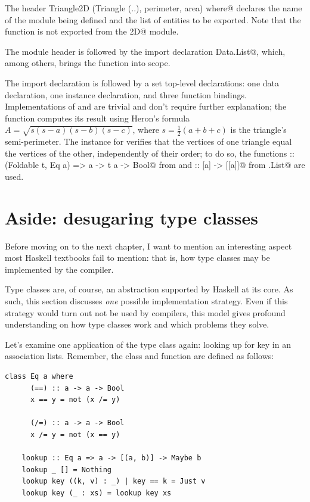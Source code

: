 \documentclass[UdineBachThesis,american,11pt]{PhdThesis}
\begin{document}
  The header
  \lstinline@module Triangle2D (Triangle (..), perimeter, area) where@ declares
  the name of the module being defined and the list of entities to be exported.
  Note that the function \lstinline@segmentLength@ is not exported from the
  \lstinline@Triangle2D@ module.

  The module header is followed by the import declaration
  \lstinline@import Data.List@, which, among others, brings the function
  \lstinline@permutations@ into scope.

  The import declaration is followed by a set top-level declarations: one data
  declaration, one instance declaration, and three function bindings.
  Implementations of \lstinline@perimeter@ and \lstinline@segmentLength@ are
  trivial and don't require further explanation; the \lstinline@area@ function
  computes its result using Heron's formula
  $A = \sqrt{s \left(s - a\right) \left(s - b\right) \left(s - c\right)}$, where
  $s = \frac{1}{2} \left(a + b + c\right)$ is the triangle's semi-perimeter. The
  \lstinline@Eq@ instance for \lstinline@Triangle@ verifies that the vertices of
  one triangle equal the vertices of the other, independently of their order;
  to do so, the functions
  \lstinline@elem :: (Foldable t, Eq a) => a -> t a -> Bool@ from
  \lstinline@Prelude@ and \lstinline@permutations :: [a] -> [[a]]@ from
  \lstinline@Data.List@ are used.

  \section{Aside: desugaring type classes}

  Before moving on to the next chapter, I want to mention an interesting aspect
  most Haskell textbooks fail to mention: that is, how type classes may be
  implemented by the compiler.

  Type classes are, of course, an abstraction supported by Haskell at its core.
  As such, this section discusses \emph{one} possible implementation strategy.
  Even if this strategy would turn out not be used by compilers, this model
  gives profound understanding on how type classes work and which problems they
  solve.

  Let's examine one application of the \lstinline@Eq@ type class again: looking
  up for key in an association lists. Remember, the \lstinline@Eq@ class and
  \lstinline@lookup@ function are defined as follows:

  \begin{lstlisting}[gobble=4,basicstyle=\ttfamily\small]
    class Eq a where
      (==) :: a -> a -> Bool
      x == y = not (x /= y)

      (/=) :: a -> a -> Bool
      x /= y = not (x == y)

    lookup :: Eq a => a -> [(a, b)] -> Maybe b
    lookup _ [] = Nothing
    lookup key ((k, v) : _) | key == k = Just v
    lookup key (_ : xs) = lookup key xs
  \end{lstlisting}
\end{document}

